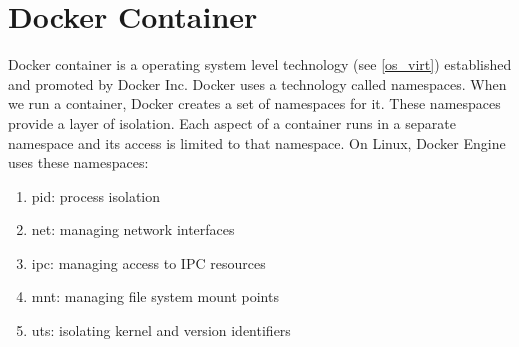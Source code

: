 \section{Docker Container \cite{docker}} 
\label{docker}
Docker container is a operating system level technology (see \ref{os_virt}) established and promoted by Docker Inc. Docker uses a technology called namespaces. When we run a container, Docker creates a set of namespaces for it. These namespaces provide a layer of isolation. Each aspect of a container runs in a separate namespace and its access is limited to that namespace.
On Linux, Docker Engine uses these namespaces:
\begin{enumerate}
\item pid: process isolation
\item net: managing network interfaces
\item ipc: managing access to IPC resources
\item mnt: managing file system mount points
\item uts: isolating kernel and version identifiers
\end{enumerate}


